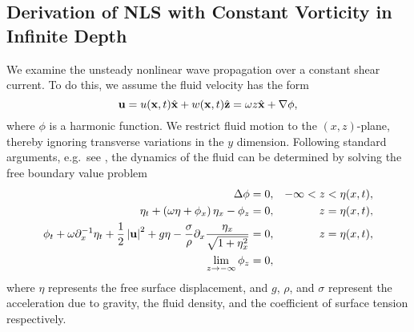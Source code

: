\documentclass{JFM_Style/jfm}
\newcommand{\pd}{\partial}
\begin{document}
\subsection{Derivation of NLS with Constant Vorticity in Infinite Depth}
We examine the unsteady nonlinear wave propagation over a constant shear current.  To do this, we assume the fluid velocity has the form
\[
{\bf u} = u({\bf x},t)\hat{{\bf x}} + w({\bf x},t)\hat{{\bf z}} = \omega z\hat{{\bf x}} + \nabla \phi,
\]
where $\phi$ is a harmonic function.  We restrict fluid motion to the $(x,z)$-plane, thereby ignoring transverse variations in the $y$ dimension.   Following standard arguments, e.g.~see \cite{ashton}, the dynamics of the fluid can be determined by solving the free boundary value problem
\begin{align}
\Delta \phi = 0, & & -\infty< z < \eta(x,t), \nonumber \\
\eta_{t} +\left(\omega\eta+\phi_{x}\right)\eta_{x} - \phi_{z} = 0, & & z=\eta(x,t), \label{kine}\\
\phi_{t} + \omega\pd_{x}^{-1}\eta_{t} + \frac{1}{2} \left|{\bf
    u}\right|^{2} + g\eta -
\frac{\sigma}{\rho}\pd_{x}\frac{\eta_{x}}{\sqrt{1+\eta_{x}^{2}}}= 0, &
& z=\eta(x,t), \label{bernou}\\
\lim_{z\rightarrow -\infty} \phi_{z} = 0, \nonumber
\end{align}
where $\eta$ represents the free surface displacement, and $g$, $\rho$, and $\sigma$ represent the acceleration due to gravity, the fluid density, and the coefficient of surface tension respectively.
\end{document}
